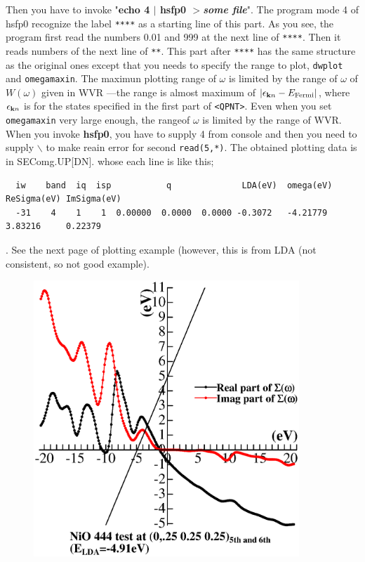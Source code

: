 \documentclass[a4paper,10pt,epsf,fleqn]{article}
\newcommand{\bfk}{{\bf k}}
\newcommand{\raw}[1]{{\tt #1}}
\begin{document}
{{{\baselineskip=4mm
Then you have to invoke "{\bf echo 4 $|$ hsfp0 $>${\it some file}}".
The program mode 4 of hsfp0 recognize the label {\tt *****} as a starting line of this 
part. As you see, the program first read the numbers 0.01 and 999 
at the next line of {\tt *****}. Then it reads numbers of the next line of {\tt ***}.
This part after {\tt *****} has the same structure as the original ones 
except that you needs to specify the range to plot,
\raw{dwplot} and \raw{omegamaxin}.
The maximun plotting range of $\omega$
is limited by the range of $\omega$ of $W(\omega)$ given in {\sf WVR} ---the range is almost
maximum of $|\epsilon_{\bfk n} -E_{\rm Fermi}|$, where $\epsilon_{\bfk n}$ is 
for the states specified in the first part of \verb#<QPNT>#.
Even when you set {\tt omegamaxin} very large enough,
the rangeof $\omega$ is limited by the range of {\sf WVR}.
When you invoke {\bf hsfp0}, you have to supply 4 from console and
then you need to supply $\backslash$ to make reain error for second {\tt read(5,*)}.
The obtained plotting data is in S{\sf EComg.UP[DN]}.
whose each line is like this;
{\baselineskip=3.5mm
\begin{verbatim}
  iw    band  iq  isp           q              LDA(eV)  omega(eV)  ReSigma(eV) ImSigma(eV)
  -31    4    1    1  0.00000  0.0000  0.0000 -0.3072   -4.21779   3.83216     0.22379
\end{verbatim}}.
See the next page of plotting example (however, this is from LDA (not consistent,
so not good example).


\begin{figure}
\includegraphics[width=10cm]{nio_sp1.eps}


\end{figure}}}}
\end{document}
